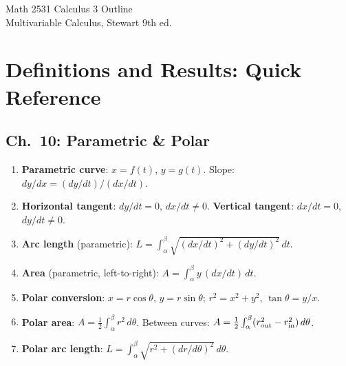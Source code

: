 \documentclass[12pt]{article}
\theoremstyle{compact}
\begin{document}
\raggedright
\begin{center}
      {\large Math 2531 Calculus 3 Outline}\\
  {Multivariable Calculus, Stewart 9th ed.}\\
\end{center}

\tableofcontents
\newpage

\section{Definitions and Results: Quick Reference}

\subsection{Ch.\ 10: Parametric \& Polar}
\begin{enumerate}[label=\textbf{10.\arabic*.},leftmargin=*,itemsep=1pt]
  \item \textbf{Parametric curve}: $x=f(t)$, $y=g(t)$. Slope: $dy/dx=(dy/dt)/(dx/dt)$.
  \item \textbf{Horizontal tangent}: $dy/dt=0$, $dx/dt\ne0$. \textbf{Vertical tangent}: $dx/dt=0$, $dy/dt\ne0$.
  \item \textbf{Arc length} (parametric): $L=\int_\alpha^\beta\sqrt{(dx/dt)^2+(dy/dt)^2}\,dt$.
  \item \textbf{Area} (parametric, left-to-right): $A=\int_\alpha^\beta y\,(dx/dt)\,dt$.
  \item \textbf{Polar conversion}: $x=r\cos\theta$, $y=r\sin\theta$; $r^2=x^2+y^2$, $\tan\theta=y/x$.
  \item \textbf{Polar area}: $A=\tfrac{1}{2}\int_\alpha^\beta r^2\,d\theta$. Between curves: $A=\tfrac{1}{2}\int_\alpha^\beta(r_{\rm out}^2-r_{\rm in}^2)\,d\theta$.
  \item \textbf{Polar arc length}: $L=\int_\alpha^\beta\sqrt{r^2+(dr/d\theta)^2}\,d\theta$.
\end{enumerate}
\end{document}
